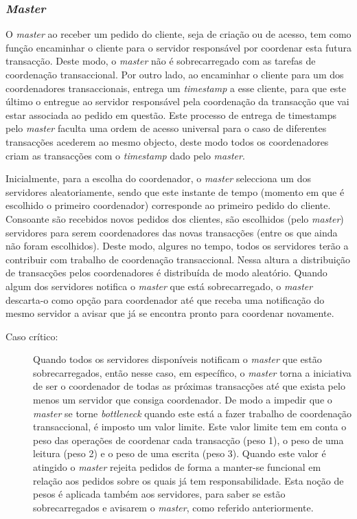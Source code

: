 \subsubsection{\textit{Master}}

O \textit{\textit{master}} ao receber um pedido do cliente, seja de criação ou de acesso, tem como função encaminhar o cliente para o servidor responsável por coordenar esta futura transacção. Deste modo, o \textit{master} não é sobrecarregado com as tarefas de coordenação transaccional. Por outro lado, ao encaminhar o cliente para um dos coordenadores transaccionais, entrega um \textit{timestamp} a esse cliente, para que este último o entregue ao servidor responsável pela coordenação da transacção que vai estar associada ao pedido em questão. Este processo de entrega de timestamps pelo \textit{master} faculta uma ordem de acesso universal para o caso de diferentes transacções acederem ao mesmo objecto, deste modo todos os coordenadores criam as transacções com o \textit{timestamp} dado pelo \textit{master}.

Inicialmente, para a escolha do coordenador, o \textit{master} selecciona um dos servidores aleatoriamente, sendo que este instante de tempo (momento em que é escolhido o primeiro coordenador) corresponde ao primeiro pedido do cliente. Consoante são recebidos novos pedidos dos clientes, são escolhidos (pelo \textit{master}) servidores para serem coordenadores das novas transacções (entre os que ainda não foram escolhidos). Deste modo, algures no tempo, todos os servidores terão a contribuir com trabalho de coordenação transaccional. Nessa altura a distribuição de transacções pelos coordenadores é distribuída de modo aleatório. Quando algum dos servidores notifica o \textit{master} que está  sobrecarregado, o \textit{master} descarta-o como opção para coordenador até que receba uma notificação do mesmo servidor a avisar que já se encontra pronto para coordenar novamente.

\begin{description}
\item[Caso crítico:] Quando todos os servidores disponíveis notificam o \textit{master} que estão sobrecarregados, então nesse caso, em específico, o \textit{master} torna a iniciativa de ser o coordenador de todas as próximas transacções até que exista pelo menos um servidor que consiga coordenador. De modo a impedir que o \textit{master} se torne \textit{bottleneck} quando este está a fazer trabalho de coordenação transaccional, é imposto um valor limite. Este valor limite tem em conta o peso das operações de coordenar cada transacção (peso 1), o peso de uma leitura (peso 2) e o peso de uma escrita (peso 3). Quando este valor é atingido o \textit{master} rejeita pedidos de forma a manter-se funcional em relação aos pedidos sobre os quais já tem responsabilidade. Esta noção de pesos é aplicada também aos servidores, para saber se estão sobrecarregados e avisarem o \textit{master}, como referido anteriormente.
\end{description}

